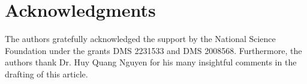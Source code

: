 \documentclass[11pt, reqno]{article}
\begin{document}
\section{Acknowledgments}
The authors gratefully acknowledged the support by the National Science Foundation under the grants DMS 2231533 and DMS 2008568. 
Furthermore, the authors thank Dr. Huy Quang Nguyen for his many insightful comments in the drafting of this article.




\end{document}
